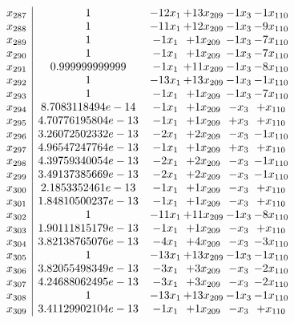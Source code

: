 \documentclass[11pt]{article}
\begin{document}
\[\begin{array}{c| c c@{\hskip 2pt} c@{\hskip 2pt} c@{\hskip 2pt} c@{\hskip 2pt} }
 x_{287}   &  1 & -12 x_{1} & + 13 x_{209} & -1 x_{3} & -1 x_{110}\\
 x_{288}   &  1 & -11 x_{1} & + 12 x_{209} & -1 x_{3} & -9 x_{110}\\
 x_{289}   &  1 & -1 x_{1} & + 1 x_{209} & -1 x_{3} & -7 x_{110}\\
 x_{290}   &  1 & -1 x_{1} & + 1 x_{209} & -1 x_{3} & -7 x_{110}\\
 x_{291}   &  0.999999999999 & -1 x_{1} & + 11 x_{209} & -1 x_{3} & -8 x_{110}\\
 x_{292}   &  1 & -13 x_{1} & + 13 x_{209} & -1 x_{3} & -1 x_{110}\\
 x_{293}   &  1 & -1 x_{1} & + 1 x_{209} & -1 x_{3} & -7 x_{110}\\
 x_{294}   &  8.7083118494e-14 & -1 x_{1} & + 1 x_{209} & - x_{3} & +  x_{110}\\
 x_{295}   &  4.70776195804e-13 & -1 x_{1} & + 1 x_{209} & +  x_{3} & +  x_{110}\\
 x_{296}   &  3.26072502332e-13 & -2 x_{1} & + 2 x_{209} & - x_{3} & -1 x_{110}\\
 x_{297}   &  4.96547247764e-13 & -1 x_{1} & + 1 x_{209} & +  x_{3} & +  x_{110}\\
 x_{298}   &  4.39759340054e-13 & -2 x_{1} & + 2 x_{209} & - x_{3} & -1 x_{110}\\
 x_{299}   &  3.49137385669e-13 & -2 x_{1} & + 2 x_{209} & - x_{3} & -1 x_{110}\\
 x_{300}   &  2.1853352461e-13 & -1 x_{1} & + 1 x_{209} & - x_{3} & +  x_{110}\\
 x_{301}   &  1.84810500237e-13 & -1 x_{1} & + 1 x_{209} & - x_{3} & +  x_{110}\\
 x_{302}   &  1 & -11 x_{1} & + 11 x_{209} & -1 x_{3} & -8 x_{110}\\
 x_{303}   &  1.90111815179e-13 & -1 x_{1} & + 1 x_{209} & - x_{3} & +  x_{110}\\
 x_{304}   &  3.82138765076e-13 & -4 x_{1} & + 4 x_{209} & - x_{3} & -3 x_{110}\\
 x_{305}   &  1 & -13 x_{1} & + 13 x_{209} & -1 x_{3} & -1 x_{110}\\
 x_{306}   &  3.82055498349e-13 & -3 x_{1} & + 3 x_{209} & - x_{3} & -2 x_{110}\\
 x_{307}   &  4.24688062495e-13 & -3 x_{1} & + 3 x_{209} & - x_{3} & -2 x_{110}\\
 x_{308}   &  1 & -13 x_{1} & + 13 x_{209} & -1 x_{3} & -1 x_{110}\\
 x_{309}   &  3.41129902104e-13 & -1 x_{1} & + 1 x_{209} & - x_{3} & +  x_{110}\\

\end{array}\]
\end{document}
